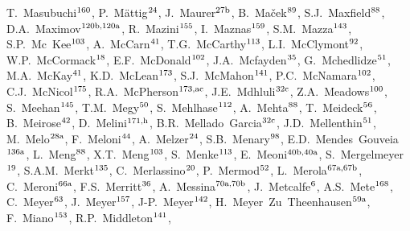 \begin{flushleft}
T.~Masubuchi$^\textrm{\scriptsize 160}$,    
P.~M\"attig$^\textrm{\scriptsize 24}$,    
J.~Maurer$^\textrm{\scriptsize 27b}$,    
B.~Ma\v{c}ek$^\textrm{\scriptsize 89}$,    
S.J.~Maxfield$^\textrm{\scriptsize 88}$,    
D.A.~Maximov$^\textrm{\scriptsize 120b,120a}$,    
R.~Mazini$^\textrm{\scriptsize 155}$,    
I.~Maznas$^\textrm{\scriptsize 159}$,    
S.M.~Mazza$^\textrm{\scriptsize 143}$,    
S.P.~Mc~Kee$^\textrm{\scriptsize 103}$,    
A.~McCarn$^\textrm{\scriptsize 41}$,    
T.G.~McCarthy$^\textrm{\scriptsize 113}$,    
L.I.~McClymont$^\textrm{\scriptsize 92}$,    
W.P.~McCormack$^\textrm{\scriptsize 18}$,    
E.F.~McDonald$^\textrm{\scriptsize 102}$,    
J.A.~Mcfayden$^\textrm{\scriptsize 35}$,    
G.~Mchedlidze$^\textrm{\scriptsize 51}$,    
M.A.~McKay$^\textrm{\scriptsize 41}$,    
K.D.~McLean$^\textrm{\scriptsize 173}$,    
S.J.~McMahon$^\textrm{\scriptsize 141}$,    
P.C.~McNamara$^\textrm{\scriptsize 102}$,    
C.J.~McNicol$^\textrm{\scriptsize 175}$,    
R.A.~McPherson$^\textrm{\scriptsize 173,ac}$,    
J.E.~Mdhluli$^\textrm{\scriptsize 32c}$,    
Z.A.~Meadows$^\textrm{\scriptsize 100}$,    
S.~Meehan$^\textrm{\scriptsize 145}$,    
T.M.~Megy$^\textrm{\scriptsize 50}$,    
S.~Mehlhase$^\textrm{\scriptsize 112}$,    
A.~Mehta$^\textrm{\scriptsize 88}$,    
T.~Meideck$^\textrm{\scriptsize 56}$,    
B.~Meirose$^\textrm{\scriptsize 42}$,    
D.~Melini$^\textrm{\scriptsize 171,h}$,    
B.R.~Mellado~Garcia$^\textrm{\scriptsize 32c}$,    
J.D.~Mellenthin$^\textrm{\scriptsize 51}$,    
M.~Melo$^\textrm{\scriptsize 28a}$,    
F.~Meloni$^\textrm{\scriptsize 44}$,    
A.~Melzer$^\textrm{\scriptsize 24}$,    
S.B.~Menary$^\textrm{\scriptsize 98}$,    
E.D.~Mendes~Gouveia$^\textrm{\scriptsize 136a}$,    
L.~Meng$^\textrm{\scriptsize 88}$,    
X.T.~Meng$^\textrm{\scriptsize 103}$,    
S.~Menke$^\textrm{\scriptsize 113}$,    
E.~Meoni$^\textrm{\scriptsize 40b,40a}$,    
S.~Mergelmeyer$^\textrm{\scriptsize 19}$,    
S.A.M.~Merkt$^\textrm{\scriptsize 135}$,    
C.~Merlassino$^\textrm{\scriptsize 20}$,    
P.~Mermod$^\textrm{\scriptsize 52}$,    
L.~Merola$^\textrm{\scriptsize 67a,67b}$,    
C.~Meroni$^\textrm{\scriptsize 66a}$,    
F.S.~Merritt$^\textrm{\scriptsize 36}$,    
A.~Messina$^\textrm{\scriptsize 70a,70b}$,    
J.~Metcalfe$^\textrm{\scriptsize 6}$,    
A.S.~Mete$^\textrm{\scriptsize 168}$,    
C.~Meyer$^\textrm{\scriptsize 63}$,    
J.~Meyer$^\textrm{\scriptsize 157}$,    
J-P.~Meyer$^\textrm{\scriptsize 142}$,    
H.~Meyer~Zu~Theenhausen$^\textrm{\scriptsize 59a}$,    
F.~Miano$^\textrm{\scriptsize 153}$,    
R.P.~Middleton$^\textrm{\scriptsize 141}$,    

\end{flushleft}
